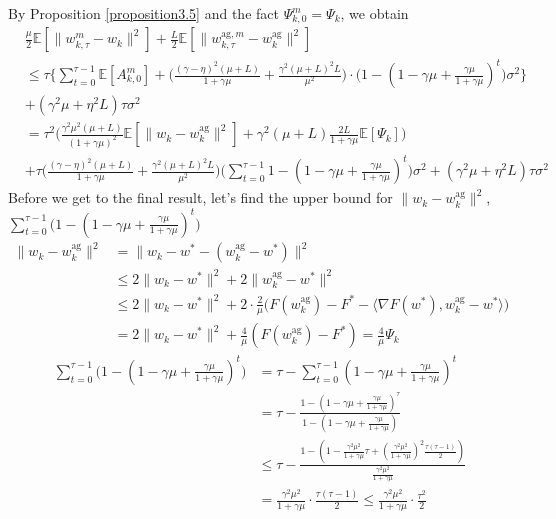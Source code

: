 \documentclass[11pt]{article}
\begin{document}
By Proposition \ref{proposition3.5} and the fact $\Psi_{k, 0}^m = \Psi_k$, we obtain
\begin{align*}
    &\frac{\mu}{2}\mathbb{E}[\|w_{k, \tau}^m - w_k\|^2] + \frac{L}{2} \mathbb{E}[\|w_{k, \tau}^{\textrm{ag}, m} - w_k^{\textrm{ag}}\|^2] \\
    &\leq \tau \Big\{ \sum_{t=0}^{\tau-1} \mathbb{E}[A_{k, 0}^m] + \Big( \frac{(\gamma-\eta)^2(\mu+L)}{1+\gamma\mu}+\frac{\gamma^2(\mu+L)^2 L}{\mu^2}\Big) \cdot \Big( 1-(1-\gamma\mu+\frac{\gamma\mu}{1+\gamma\mu})^t\Big)\sigma^2 \Big\} \\
    &+ (\gamma^2\mu+\eta^2 L)\tau\sigma^2 \\
    &= \tau^2 \Big(\frac{\gamma^2\mu^2(\mu+L)}{(1+\gamma\mu)^2}\mathbb{E}[\|w_k-w_k^{\textrm{ag}}\|^2]+\gamma^2(\mu+L)\frac{2L}{1+\gamma\mu}\mathbb{E}[\Psi_k]\Big) \\
    &+ \tau \Big( \frac{(\gamma-\eta)^2(\mu+L)}{1+\gamma\mu}+\frac{\gamma^2(\mu+L)^2 L}{\mu^2}\Big) \Big(\sum_{t=0}^{\tau-1} 1-(1-\gamma\mu+\frac{\gamma\mu}{1+\gamma\mu})^t\Big)\sigma^2 + (\gamma^2\mu+\eta^2 L)\tau\sigma^2
\end{align*}
Before we get to the final result, let's find the upper bound for $\|w_k - w_k^{\textrm{ag}}\|^2$, $\sum_{t=0}^{\tau-1}\Big( 1-(1-\gamma\mu+\frac{\gamma\mu}{1+\gamma\mu})^t\Big)$
\begin{align*}
    \|w_k - w_k^{\textrm{ag}}\|^2 &= \|w_k - w^* -(w_k^{\textrm{ag}}-w^*)\|^2 \nonumber\\
    &\leq 2\|w_k - w^*\|^2 + 2\|w_k^{
    \textrm{ag}}-w^*\|^2 \nonumber\\
    &\leq 2\|w_k - w^*\|^2 + 2\cdot \frac{2}{\mu}\Big(F(w_k^{\textrm{ag}})-F^*-\langle\nabla F(w^*),w_k^{\textrm{ag}}-w^*\rangle\Big) \nonumber\\
    &= 2\|w_k-w^*\|^2 + \frac{4}{\mu}(F(w_k^{\textrm{ag}})-F^*) = \frac{4}{\mu}\Psi_k
\end{align*}
\begin{align*}
    \sum_{t=0}^{\tau-1}\Big( 1-(1-\gamma\mu+\frac{\gamma\mu}{1+\gamma\mu})^t\Big) &= \tau - \sum_{t=0}^{\tau-1} (1-\gamma\mu+\frac{\gamma\mu}{1+\gamma\mu})^t \\
    &= \tau - \frac{1-(1-\gamma\mu+\frac{\gamma\mu}{1+\gamma\mu})^\tau}{1-(1-\gamma\mu+\frac{\gamma\mu}{1+\gamma\mu})} \\
    &\leq \tau - \frac{1-(1-\frac{\gamma^2\mu^2}{1+\gamma\mu}\tau + (\frac{\gamma^2\mu^2}{1+\gamma\mu})^2\frac{\tau(\tau-1)}{2})}{\frac{\gamma^2\mu^2}{1+\gamma\mu}} \\
    &= \frac{\gamma^2\mu^2}{1+\gamma\mu}\cdot\frac{\tau(\tau-1)}{2} \leq \frac{\gamma^2\mu^2}{1+\gamma\mu}\cdot\frac{\tau^2}{2}
\end{align*}
\end{document}
